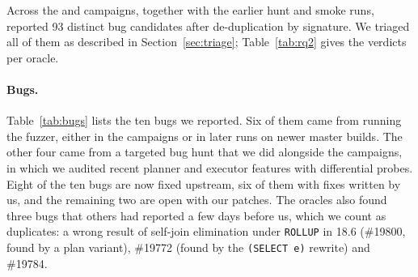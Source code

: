 Across the  and  campaigns, together with the earlier hunt and
smoke runs, \tool reported 93 distinct bug candidates after de-duplication by
signature. We triaged all of them as described in Section~\ref{sec:triage};
Table~\ref{tab:rq2} gives the verdicts per oracle.

\begin{table}[t]
  \centering
  \small
  \caption{: verdict of every triaged candidate per oracle. Duplicate:
  a real bug that had already been reported upstream. False positives include
  one intended change between versions. Flaky: did not reproduce in three
  re-runs. Open: not decided yet.}
  \label{tab:rq2}
  
\end{table}

\paragraph{Bugs.} Table~\ref{tab:bugs} lists the ten bugs we reported. Six of
them came from running the fuzzer, either in the campaigns or in later runs on
newer master builds. The other four came from a targeted bug hunt that we did
alongside the campaigns, in which we audited recent planner and executor
features with differential probes. Eight of the ten bugs are now fixed upstream,
six of them with fixes written by us, and the remaining two are open with our
patches. The oracles also found three bugs that others had reported a few days
before us, which we count as duplicates: a wrong result of self-join elimination
under \texttt{ROLLUP} in 18.6 (\#19800, found by a plan variant), \#19772 (found
by the \texttt{(SELECT e)} rewrite) and \#19784.

